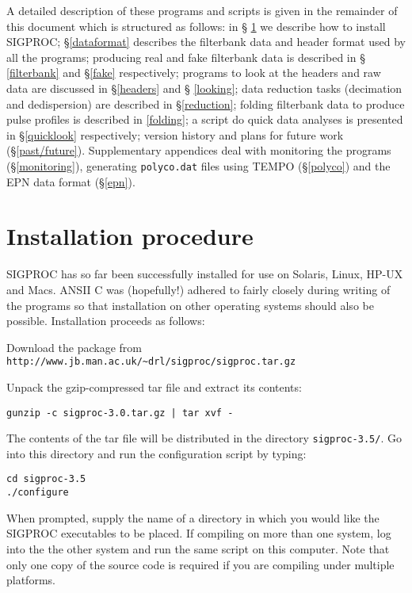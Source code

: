 \documentclass[11pt]{article}
\begin{document}
A detailed description of these programs and scripts is given in the
remainder of this document which is structured as follows: in \S
\ref{install} we describe how to install SIGPROC; \S \ref{dataformat}
describes the filterbank data and header format used by all the
programs; producing real and fake filterbank data is described in \S
\ref{filterbank} and \S \ref{fake} respectively; programs to look at
the headers and raw data are discussed in \S \ref{headers} and \S
\ref{looking}; data reduction tasks (decimation and dedispersion) are
described in \S \ref{reduction}; folding filterbank data to produce
pulse profiles is described in \ref{folding}; a script do quick data
analyses is presented in \S \ref{quicklook} respectively; version
history and plans for future work (\S \ref{past/future}). 
Supplementary appendices deal with
monitoring the programs (\S \ref{monitoring}), 
generating {\tt polyco.dat} files using {\sc TEMPO}
(\S \ref{polyco}) and the EPN data format (\S \ref{epn}).

\section{Installation procedure}
\label{install}
SIGPROC has so far been successfully installed for use on Solaris,
Linux, HP-UX and Macs.
ANSII C was (hopefully!)  adhered to fairly closely
during writing of the programs so that installation on other operating
systems should also be possible.  Installation proceeds as follows:

Download the package from 
\verb+http://www.jb.man.ac.uk/~drl/sigproc/sigproc.tar.gz+

Unpack the gzip-compressed tar file and extract its contents:

\noindent 
{\tt gunzip -c sigproc-3.0.tar.gz | tar xvf -}

The contents of the tar file will be distributed in the directory
{\tt sigproc-3.5/}. Go into this directory and run the configuration
script by typing: 

\noindent
{\tt cd sigproc-3.5}\\
{\tt ./configure}

\noindent
When prompted, supply the name
of a directory in which you would like the SIGPROC executables to
be placed.
If compiling on more than one system, log into the the other system
and run the same script on this computer.
Note that only one copy of the source code is required
if you are compiling under multiple platforms.
\end{document}
